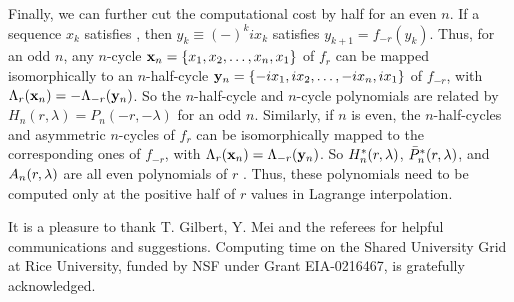 \documentclass{ws-ijbc}
\begin{document}
Finally, we can further cut the computational cost
  by half for an even $n$.
%
If a sequence $x_k$ satisfies ,
then $y_k \equiv (-)^k i x_k$
satisfies $y_{k+1} = f_{-r}(y_k)$.
%
Thus, for an odd $n$, any $n$-cycle
  $\mathbf{x}_{n} = \{x_1, x_2, \dots, x_n, x_1\}$
  of $f_r$
  can be mapped isomorphically to
  an $n$-half-cycle
  $\mathbf{y}_{n} = \{-i x_1, i x_2, \dots, - i x_n, i x_1\}$
  of $f_{-r}$,
  with $\Lambda_r(\mathbf{x}_{n}) = -\Lambda_{-r}(\mathbf{y}_{n})$.
%
So the $n$-half-cycle and $n$-cycle polynomials
  are related by
  $H_n(r, \lambda) = P_n(-r, -\lambda)$
  for an odd $n$.
%
Similarly, if $n$ is even,
  the $n$-half-cycles and asymmetric $n$-cycles of $f_r$
  can be isomorphically mapped to the corresponding ones of $f_{-r}$,
  with $\Lambda_r(\mathbf{x}_{n}) = \Lambda_{-r}(\mathbf{y}_{n})$.
%
So $H^*_{n}(r, \lambda)$,
  $\bar P^*_{n}(r, \lambda)$,
  and $A_{n}(r, \lambda)$
  are all even polynomials of $r$
.
%
Thus, these polynomials need to be computed only
  at the positive half of $r$ values
  in Lagrange interpolation.
%



 \noindent
It is a pleasure to thank T. Gilbert, Y. Mei and the referees
  for helpful communications and suggestions.
Computing time on the Shared University Grid at Rice University,
  funded by NSF under Grant EIA-0216467, is gratefully acknowledged.




\end{document}
